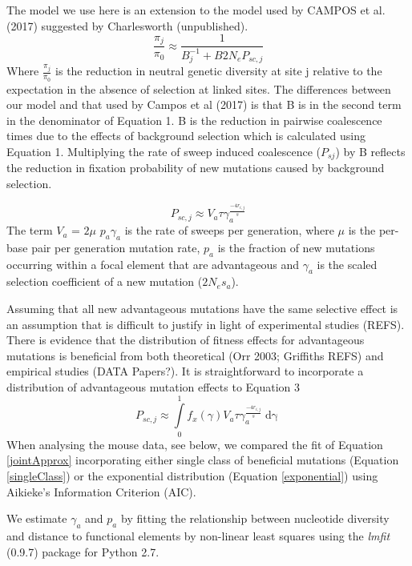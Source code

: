 \documentclass[11pt]{article}
\begin{document}
The model we use here is an extension to the model used by CAMPOS et al. (2017) suggested by Charlesworth (unpublished). 
\begin{equation}
\label{jointApprox}
\frac{\pi_{j}}{\pi_{0}} \approx  \frac{1}{B_{j}^{-1}  + B2N_eP_{sc,j}}
\end{equation}
	Where \(\frac{\pi_{j}}{\pi_{0}}\) is the reduction in neutral genetic diversity at site j relative to the expectation in the absence of selection at linked sites. The differences between our model and that used by Campos et al (2017) is that B is in the second term in the denominator of Equation 1. B is the reduction in pairwise coalescence times due to the effects of background selection which is calculated using Equation 1. Multiplying the rate of sweep induced coalescence ($P_{sj}$) by B reflects the reduction in fixation probability of new mutations caused by background selection. 

\begin{equation}
\label{singleClass}
P_{sc,j} \approx V_a \tau\gamma_a^{\frac{-4r_{i,j}}{s}} 
\end{equation}
The term $V_{a}$ = $2\mu$ $p_{a}\gamma_{a}$ is the rate of sweeps per generation, where $\mu$ is the per-base pair per generation mutation rate, $p_a$ is the fraction of new mutations occurring within a focal element that are advantageous and $\gamma_a$  is the scaled selection coefficient of a new mutation ($2N_es_a$).

	Assuming that all new advantageous mutations have the same selective effect is an assumption that is difficult to justify in light of experimental studies (REFS). There is evidence that the distribution of fitness effects for advantageous mutations is beneficial from both theoretical (Orr 2003; Griffiths REFS) and empirical studies (DATA Papers?). It is straightforward to incorporate a distribution of advantageous mutation effects to Equation 3
		\begin{equation}
		\label{exponential}
P_{sc,j} \approx \int \limits_{0}^{1} f_x(\gamma) V_a \tau\gamma_a^{\frac{-4r_{i,j}}{s}} \mathop{d\gamma}
		\end{equation}
When analysing the mouse data, see below, we compared the fit of Equation \ref{jointApprox} incorporating either single class of beneficial mutations (Equation \ref{singleClass}) or the exponential distribution (Equation \ref{exponential}) using Aikieke's Information Criterion (AIC).

	
	We estimate $\gamma_a$ and $p_a$ by fitting the relationship between nucleotide diversity and distance to functional elements by non-linear least squares using the \emph{lmfit} (0.9.7) package for Python 2.7.
 
\end{document}
